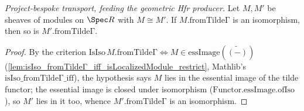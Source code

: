 \begin{lemma}
  \label{lem:isIso_fromTildeΓ_of_iso}
  \textit{Project-bespoke transport, feeding the geometric Hfr producer.}
  Let \(M, M'\) be sheaves of modules on \(\Spec R\) with \(M \cong M'\). If
  \(M.\mathrm{fromTildeΓ}\) is an isomorphism, then so is \(M'.\mathrm{fromTildeΓ}\).
\end{lemma}
\begin{proof}
  By the criterion \(\mathrm{IsIso}\,M.\mathrm{fromTildeΓ} \iff M \in \mathrm{essImage}(\widetilde{(-)})\)
  (\cref{lem:isIso_fromTildeΓ_iff_isLocalizedModule_restrict}, Mathlib's \(\mathrm{isIso\_fromTildeΓ\_iff}\)),
  the hypothesis says \(M\) lies in the essential image of the tilde functor; the essential image is
  closed under isomorphism (\(\mathrm{Functor.essImage.ofIso}\)), so \(M'\) lies in it too, whence
  \(M'.\mathrm{fromTildeΓ}\) is an isomorphism.
\end{proof}

